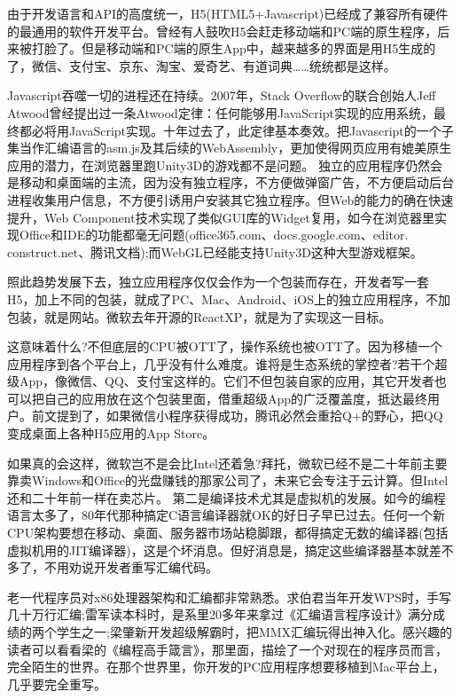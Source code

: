 \documentclass[utf8]{book}
\begin{document}
	由于开发语言和API的高度统一，H5(HTML5+Javascript)已经成了兼容所有硬件的最通用的软件开发平台。曾经有人鼓吹H5会赶走移动端和PC端的原生程序，后来被打脸了。但是移动端和PC端的原生App中，越来越多的界面是用H5生成的了，微信、支付宝、京东、淘宝、爱奇艺、有道词典……统统都是这样。
	
	Javascript吞噬一切的进程还在持续。2007年，Stack Overflow的联合创始人Jeff Atwood曾经提出过一条Atwood定律：任何能够用JavaScript实现的应用系统，最终都必将用JavaScript实现。十年过去了，此定律基本奏效。把Javascript的一个子集当作汇编语言的asm.js及其后续的WebAssembly，更加使得网页应用有媲美原生应用的潜力，在浏览器里跑Unity3D的游戏都不是问题。
	独立的应用程序仍然会是移动和桌面端的主流，因为没有独立程序，不方便做弹窗广告，不方便启动后台进程收集用户信息，不方便引诱用户安装其它独立程序。但Web的能力的确在快速提升，Web Component技术实现了类似GUI库的Widget复用，如今在浏览器里实现Office和IDE的功能都毫无问题(office365.com、docs.google.com、editor. construct.net、腾讯文档);而WebGL已经能支持Unity3D这种大型游戏框架。
	
	照此趋势发展下去，独立应用程序仅仅会作为一个包装而存在，开发者写一套H5，加上不同的包装，就成了PC、Mac、Android、iOS上的独立应用程序，不加包装，就是网站。微软去年开源的ReactXP，就是为了实现这一目标。
	
	这意味着什么?不但底层的CPU被OTT了，操作系统也被OTT了。因为移植一个应用程序到各个平台上，几乎没有什么难度。谁将是生态系统的掌控者?若干个超级App，像微信、QQ、支付宝这样的。它们不但包装自家的应用，其它开发者也可以把自己的应用放在这个包装里面，借重超级App的广泛覆盖度，抵达最终用户。前文提到了，如果微信小程序获得成功，腾讯必然会重拾Q+的野心，把QQ变成桌面上各种H5应用的App Store。
	
	如果真的会这样，微软岂不是会比Intel还着急?拜托，微软已经不是二十年前主要靠卖Windows和Office的光盘赚钱的那家公司了，未来它会专注于云计算。但Intel还和二十年前一样在卖芯片。
	第二是编译技术尤其是虚拟机的发展。如今的编程语言太多了，80年代那种搞定C语言编译器就OK的好日子早已过去。任何一个新CPU架构要想在移动、桌面、服务器市场站稳脚跟，都得搞定无数的编译器(包括虚拟机用的JIT编译器)，这是个坏消息。但好消息是，搞定这些编译器基本就差不多了，不用劝说开发者重写汇编代码。
	
	老一代程序员对x86处理器架构和汇编都非常熟悉。求伯君当年开发WPS时，手写几十万行汇编;雷军读本科时，是系里20多年来拿过《汇编语言程序设计》满分成绩的两个学生之一;梁肇新开发超级解霸时，把MMX汇编玩得出神入化。感兴趣的读者可以看看梁的《编程高手箴言》，那里面，描绘了一个对现在的程序员而言，完全陌生的世界。在那个世界里，你开发的PC应用程序想要移植到Mac平台上，几乎要完全重写。
	
\end{document}
